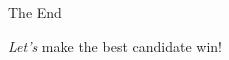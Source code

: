 \documentclass[xcolor=dvipsnames]{beamer}
\begin{document}
\begin{frame}[fragile]{The End}
  \begin{figure}
  \end{figure}
  \emph{Let's} make the best candidate win!
\end{frame}

\end{document}
